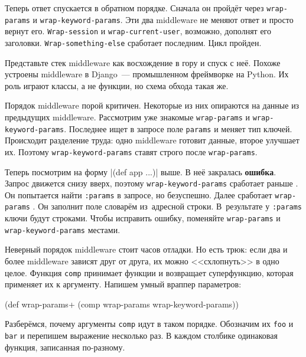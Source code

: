 Теперь ответ спускается в обратном порядке. Сначала он пройдёт через
\verb|wrap-params| и \verb|wrap-keyword-params|. Эти два middleware не меняют
ответ и просто вернут его. \verb|Wrap-session| и \verb|wrap-current-user|,
возможно, дополнят его заголовки. \texttt{Wrap\--some\-thing\--else} сработает
последним. Цикл пройден.


Представьте стек middleware как восхождение в гору и спуск с неё. Похоже
устроены middleware в Django~--- промышленном фреймворке на Python. Их роль
играют классы, а не функции, но схема обхода такая же.

Порядок middleware порой критичен. Некоторые из них опираются на данные из
предыдущих middleware. Рассмотрим уже знакомые \verb|wrap-params| и
\verb|wrap-keyword-params|. Последнее ищет в запросе поле \verb|params| и меняет
тип ключей. Происходит разделение труда: одно middleware готовит данные, второе
улучшает их. Поэтому \verb|wrap-keyword-params| ставят строго после
\verb|wrap-params|.


\mnoindent Теперь посмотрим на форму \spverb|(def app ...)| выше. В неё
закралась \textbf{ошибка}. Запрос движется снизу вверх, поэтому
\texttt{wrap\--key\-word\--params} сработает раньше . Он попытается найти
\verb|:params| в запросе, но безуспешно. Далее сработает \verb|wrap-params|
. Он заполнит поле словарём из~адресной строки. В~результате у
\verb|:params| ключи будут строками. Чтобы исправить ошибку, поменяйте
\verb|wrap-params| и \verb|wrap-keyword-params| местами.

Неверный порядок middleware стоит часов отладки. Но есть трюк: если два и более
middleware зависят друг от друга, их можно <<схлопнуть>> в одно целое. Функция
\verb|comp| принимает функции и возвращает суперфункцию, которая применяет их
к аргументу. Напишем умный враппер параметров:


\begin{english}
  \begin{clojure}
(def wrap-params+
  (comp wrap-params wrap-keyword-params))
  \end{clojure}
\end{english}

Разберёмся, почему аргументы \verb|comp| идут в таком порядке. Обозначим
их \verb|foo| и \verb|bar| и перепишем выражение несколько раз. В каждом
столбике одинаковая функция, записанная по-разному.

